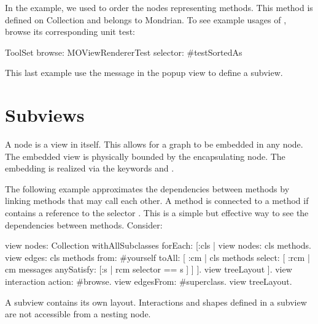 \documentclass[a4paper,10pt,twoside]{book}
\begin{document}
In the example, we used  to order the nodes representing methods. This method is defined on Collection and belongs to Mondrian. To see example usages of , browse its corresponding unit test:
\begin{code}{}
ToolSet browse: MOViewRendererTest selector: #testSortedAs 
\end{code}

This last example use the message  in the popup view to define a subview.


\section{Subviews}

A node is a view in itself. This allows for a graph to be embedded in any node. The embedded view is physically bounded by the encapsulating node. The embedding is realized via the keywords  and . 

The following example approximates the dependencies between methods by linking methods that may call each other. A method  is connected to a method  if  contains a reference to the selector . This is a simple but effective way to see the dependencies between methods. Consider:

\begin{code}{}
view nodes: Collection withAllSubclasses forEach: [:cls |
	view nodes: cls methods.
	view edges: cls methods from: #yourself toAll: [ :cm | cls methods select: [ :rcm |  cm messages anySatisfy: [:s | rcm selector == s ] ] ].
	view treeLayout
].
view interaction action: #browse.
view edgesFrom: #superclass.
view treeLayout.
\end{code}

A subview contains its own layout. Interactions and shapes defined in a subview are not accessible from a nesting node. 

\end{document}
